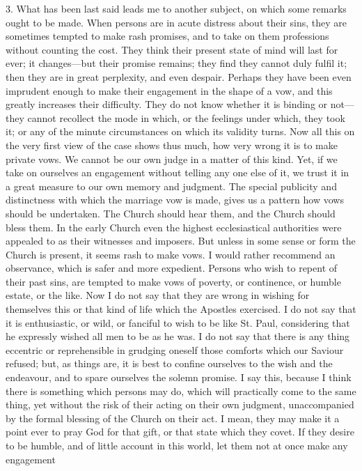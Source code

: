 3. What has been last said leads me to another subject, on which
some remarks ought to be made. When persons are in acute distress
about their sins, they are sometimes tempted to make rash promises,
and to take on them professions without counting the cost. They think
their present state of mind will last for ever; it changes—but their
promise remains; they find they cannot duly fulfil it; then they are
in great perplexity, and even despair. Perhaps they have been even
imprudent enough to make their engagement in the shape of a vow, and
this greatly increases their difficulty. They do not know whether it
is binding or not—they cannot recollect the mode in which, or the
feelings under which, they took it; or any of the minute circumstances
on which its validity turns. Now all this on the very first view of
the case shows thus much, how very wrong it is to make private vows.
We cannot be our own judge in a matter of this kind. Yet, if we take
on ourselves an engagement without telling any one else of it, we
trust it in a great measure to our own memory and judgment. The
special publicity and distinctness with which the marriage vow is
made, gives us a pattern how vows should be undertaken. The Church
should hear them, and the Church should bless them. In the early
Church even the highest ecclesiastical authorities were appealed to as
their witnesses and imposers. But unless in some sense or form the
Church is present, it seems rash to make vows. I would rather
recommend an observance, which is safer and more expedient. Persons
who wish to repent of their past sins, are tempted to make vows of
poverty, or continence, or humble estate, or the like. Now I do not
say that they are wrong in wishing for themselves this or that kind of
life which the Apostles exercised. I do not say that it is
enthusiastic, or wild, or fanciful to wish to be like St. Paul,
considering that he expressly wished all men to be as he was. I do not
say that there is any thing eccentric or reprehensible in grudging
oneself those comforts which our Saviour refused; but, as things are,
it is best to confine ourselves to the wish and the endeavour, and to
spare ourselves the solemn promise. I say this, because I think there
is something which persons may do, which will practically come to the
same thing, yet without the risk of their acting on their own
judgment, unaccompanied by the formal blessing of the Church on their
act. I mean, they may make it a point ever to pray God for that gift,
or that state which they covet. If they desire to be humble, and of
little account in this world, let them not at once make any engagement
